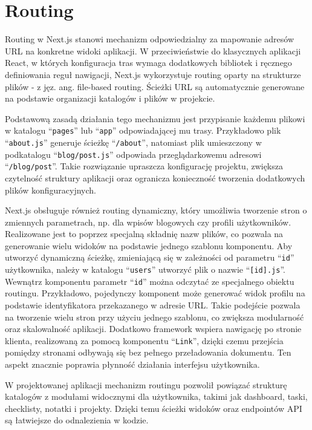 \documentclass[12pt,a4paper,twoside]{report}
\newcommand{\FirstParagraph}{\noindent\ignorespaces}
\begin{document}
\section{Routing}

\FirstParagraph Routing w Next.js stanowi mechanizm odpowiedzialny za mapowanie adresów URL na konkretne widoki aplikacji. W przeciwieństwie do klasycznych aplikacji React, w których konfiguracja tras wymaga dodatkowych bibliotek i ręcznego definiowania reguł nawigacji, Next.js wykorzystuje routing oparty na strukturze plików - z jęz. ang. file-based routing. Ścieżki URL są automatycznie generowane na podstawie organizacji katalogów i plików w projekcie.

Podstawową zasadą działania tego mechanizmu jest przypisanie każdemu plikowi w katalogu ``\texttt{pages}'' lub ``\texttt{app}'' odpowiadającej mu trasy. Przykładowo plik ``\texttt{about.js}'' generuje ścieżkę ``\texttt{/about}'', natomiast plik umieszczony w podkatalogu ``\texttt{blog/post.js}'' odpowiada przeglądarkowemu adresowi ``\texttt{/blog/post}''. Takie rozwiązanie upraszcza konfigurację projektu, zwiększa czytelność struktury aplikacji oraz ogranicza konieczność tworzenia dodatkowych plików konfiguracyjnych.

Next.js obsługuje również routing dynamiczny, który umożliwia tworzenie stron o zmiennych parametrach, np. dla wpisów blogowych czy profili użytkowników. Realizowane jest to poprzez specjalną składnię nazw plików, co pozwala na generowanie wielu widoków na podstawie jednego szablonu komponentu. Aby utworzyć dynamiczną ścieżkę, zmieniającą się w zależności od parametru ``\texttt{id}'' użytkownika, należy w katalogu ``\texttt{users}'' utworzyć plik o nazwie ``\texttt{[id].js}''. Wewnątrz komponentu parametr ``\texttt{id}'' można odczytać ze specjalnego obiektu routingu. Przykładowo, pojedynczy komponent może generować widok profilu na podstawie identyfikatora przekazanego w adresie URL. Takie podejście pozwala na tworzenie wielu stron przy użyciu jednego szablonu, co zwiększa modularność oraz skalowalność aplikacji. Dodatkowo framework wspiera nawigację po stronie klienta, realizowaną za pomocą komponentu ``\texttt{Link}'', dzięki czemu przejścia pomiędzy stronami odbywają się bez pełnego przeładowania dokumentu. Ten aspekt znacznie poprawia płynność działania interfejsu użytkownika.

W projektowanej aplikacji mechanizm routingu pozwolił powiązać strukturę katalogów z modułami widocznymi dla użytkownika, takimi jak dashboard, taski, checklisty, notatki i projekty. Dzięki temu ścieżki widoków oraz endpointów API są łatwiejsze do odnalezienia w kodzie.
\end{document}
